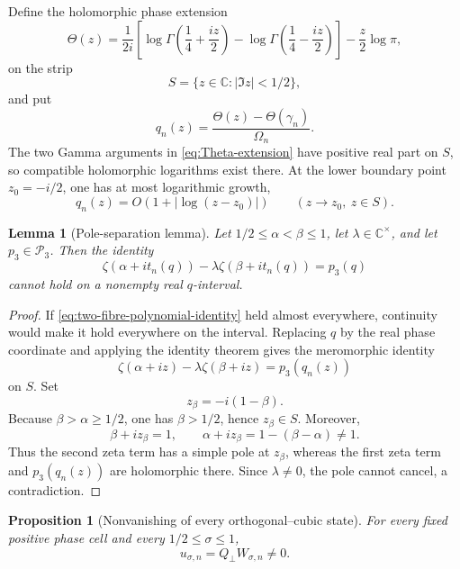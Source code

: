 \documentclass[11pt]{amsart}
\numberwithin{equation}{section}
\newtheorem{proposition}[theorem]{Proposition}
\newtheorem{lemma}[theorem]{Lemma}
\newcommand{\C}{\mathbb C}
\begin{document}
Define the holomorphic phase extension
\begin{equation}
\Theta(z)=\frac{1}{2i}\left[
\log\Gamma\!\left(\frac14+\frac{iz}{2}\right)
-\log\Gamma\!\left(\frac14-\frac{iz}{2}\right)
\right]-\frac z2\log\pi,
\label{eq:Theta-extension}
\end{equation}
on the strip
\[
S=\{z\in\C:|\Im z|<1/2\},
\]
and put
\begin{equation}
q_n(z)=\frac{\Theta(z)-\Theta(\gamma_n)}{\Omega_n}.
\label{eq:q-holomorphic-extension}
\end{equation}
The two Gamma arguments in \eqref{eq:Theta-extension} have positive real
part on $S$, so compatible holomorphic logarithms exist there.  At the
lower boundary point $z_0=-i/2$, one has at most logarithmic growth,
\begin{equation}
q_n(z)=O\!\left(1+|\log(z-z_0)|\right)
\qquad(z\longrightarrow z_0,\ z\in S).
\label{eq:q-boundary-growth}
\end{equation}

\begin{lemma}[Pole-separation lemma]
\label{lem:pole-separation}
Let $1/2\le\alpha<\beta\le1$, let $\lambda\in\C^\times$, and let
$p_3\in\mathcal P_3$.  Then the identity
\begin{equation}
\zeta(\alpha+i t_n(q))-\lambda\zeta(\beta+i t_n(q))=p_3(q)
\label{eq:two-fibre-polynomial-identity}
\end{equation}
cannot hold on a nonempty real $q$-interval.
\end{lemma}

\begin{proof}
If \eqref{eq:two-fibre-polynomial-identity} held almost everywhere, continuity
would make it hold everywhere on the interval.  Replacing $q$ by the real
phase coordinate and applying the identity theorem gives the meromorphic
identity
\[
\zeta(\alpha+iz)-\lambda\zeta(\beta+iz)=p_3(q_n(z))
\]
on $S$.  Set
\[
z_\beta=-i(1-\beta).
\]
Because $\beta>\alpha\ge1/2$, one has $\beta>1/2$, hence
$z_\beta\in S$.  Moreover,
\[
\beta+iz_\beta=1,
\qquad
\alpha+iz_\beta=1-(\beta-\alpha)\ne1.
\]
Thus the second zeta term has a simple pole at $z_\beta$, whereas the
first zeta term and $p_3(q_n(z))$ are holomorphic there.  Since
$\lambda\ne0$, the pole cannot cancel, a contradiction.
\end{proof}

\begin{proposition}[Nonvanishing of every orthogonal--cubic state]
\label{prop:projected-state-nonzero}
For every fixed positive phase cell and every $1/2\le\sigma\le1$,
\begin{equation}
\boxed{u_{\sigma,n}=Q_\perp W_{\sigma,n}\ne0.}
\label{eq:projected-state-nonzero}
\end{equation}
\end{proposition}
\end{document}
